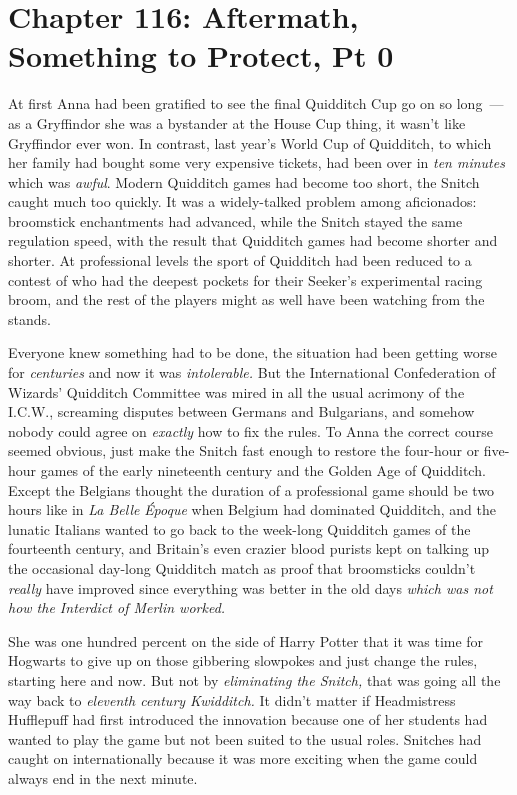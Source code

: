 \chapter{Chapter 116: Aftermath, Something to Protect, Pt 0}
At first Anna had been gratified to see the final Quidditch Cup go on so long~--- as a Gryffindor she was a bystander at the House Cup thing, it wasn't like Gryffindor ever won. In contrast, last year's World Cup of Quidditch, to which her family had bought some very expensive tickets, had been over in \emph{ten minutes} which was \emph{awful}. Modern Quidditch games had become too short, the Snitch caught much too quickly. It was a widely-talked problem among aficionados: broomstick enchantments had advanced, while the Snitch stayed the same regulation speed, with the result that Quidditch games had become shorter and shorter. At professional levels the sport of Quidditch had been reduced to a contest of who had the deepest pockets for their Seeker's experimental racing broom, and the rest of the players might as well have been watching from the stands.

Everyone knew something had to be done, the situation had been getting worse for \emph{centuries} and now it was \emph{intolerable.} But the International Confederation of Wizards' Quidditch Committee was mired in all the usual acrimony of the I.C.W., screaming disputes between Germans and Bulgarians, and somehow nobody could agree on \emph{exactly} how to fix the rules. To Anna the correct course seemed obvious, just make the Snitch fast enough to restore the four-hour or five-hour games of the early nineteenth century and the Golden Age of Quidditch. Except the Belgians thought the duration of a professional game should be two hours like in \emph{La Belle} \emph{Époque} when Belgium had dominated Quidditch, and the lunatic Italians wanted to go back to the week-long Quidditch games of the fourteenth century, and Britain's even crazier blood purists kept on talking up the occasional day-long Quidditch match as proof that broomsticks couldn't \emph{really} have improved since everything was better in the old days \emph{which was not how the Interdict of Merlin worked.}

She was one hundred percent on the side of Harry Potter that it was time for Hogwarts to give up on those gibbering slowpokes and just change the rules, starting here and now. But not by \emph{eliminating the Snitch,} that was going all the way back to \emph{eleventh century Kwidditch.} It didn't matter if Headmistress Hufflepuff had first introduced the innovation because one of her students had wanted to play the game but not been suited to the usual roles. Snitches had caught on internationally because it was more exciting when the game could always end in the next minute.

